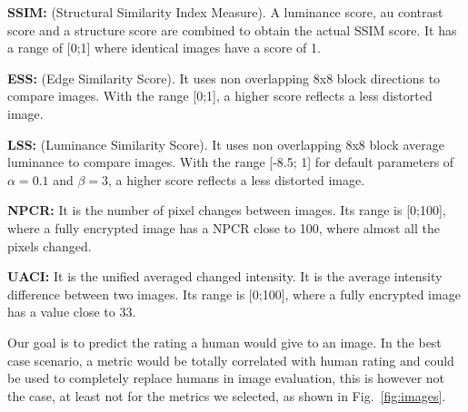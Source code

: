 \documentclass{article}
\begin{document}
\textbf{SSIM\cite{wang2004image}:} (Structural Similarity Index Measure). A luminance score, au contrast score and a structure score are combined to obtain the actual SSIM score. It has a range of [0;1] where identical images have a score of 1.

\textbf{ESS\cite{mao2004security}:} (Edge Similarity Score). It uses non overlapping 8x8 block directions to compare images. With the range [0;1], a higher score reflects a less distorted image.

\textbf{LSS\cite{mao2004security}:} (Luminance Similarity Score). It uses non overlapping 8x8 block average luminance to compare images. With the range [-8.5; 1] for default parameters of $\alpha=0.1$ and $\beta=3$, a higher score reflects a less distorted image.

\textbf{NPCR\cite{chen2004symmetric, mao2004novel}:} It is the number of pixel changes between images. Its range is [0;100], where a fully encrypted image has a NPCR close to 100, where almost all the pixels changed.

\textbf{UACI\cite{chen2004symmetric, mao2004novel}:} It is the unified averaged changed intensity. It is the average intensity difference between two images. Its range is [0;100], where a fully encrypted image has a value close to 33.




Our goal is to predict the rating a human would give to an image. In the best case scenario, a metric would be totally correlated with human rating and could be used to completely replace humans in image evaluation, this is however not the case, at least not for the metrics we selected, as shown in Fig.~\ref{fig:images}.
\end{document}
